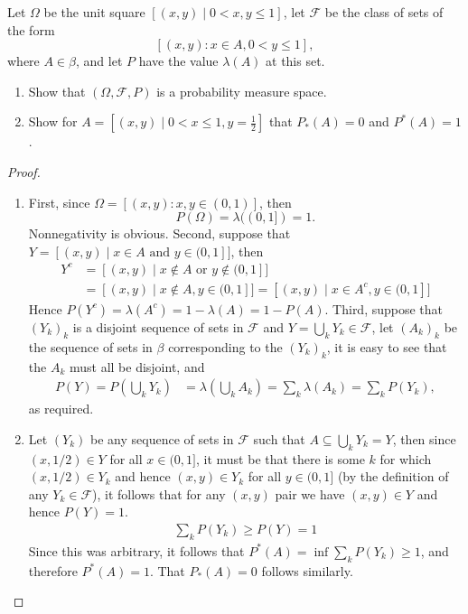 \documentclass[11pt]{article}
\newcommand{\F}{\mathcal{F}}
\newcommand{\B}{\beta}
\newcommand{\seq}{\subseteq}
\newcommand{\Om}{\Omega}
\newenvironment{exercise}[2][Exercise]{\begin{trivlist}
\item[\hskip \labelsep {\bfseries #1}\hskip \labelsep {\bfseries #2.}]}{\end{trivlist}}
\begin{document}
\begin{exercise}{3.5}
    Let $\Om$ be the unit square $\left [ (x, y) \mid 0 < x, y \leq 1 \right]$, let $\F$ be the class of sets of the form 
    \[ [(x, y): x \in A, 0 < y \leq 1] ,\]
     where $A \in \B$, and let $P$ have the value $\lambda(A)$ at this set. 
    \begin{enumerate}
        \item Show that $(\Om, \F, P)$ is a probability measure space.
        \item Show for $A = \left [(x, y) \mid 0 < x \leq 1, y = \frac{1}{2} \right ]$ that $P_{\ast} (A) = 0$ and $P^\ast (A) = 1$.
    \end{enumerate}
\end{exercise}
\begin{proof}
    \begin{enumerate}
        \item First, since $\Om = [(x, y): x, y \in (0, 1)]$, then
        \[ P(\Om) = \lambda( (0, 1] ) = 1. \]
        Nonnegativity is obvious. Second, suppose that $Y = [(x, y) \mid x \in A \text { and } y \in (0, 1]]$, then
        \begin{align*}
            Y^{c} &= [ (x, y) \mid x \notin A \text { or } y \notin (0, 1] ] \\
            &= [ (x, y) \mid x \notin A, y \in (0, 1] ] = [(x, y) \mid x \in A^c, y \in (0, 1]]
        \end{align*}
        Hence $P(Y^c) = \lambda(A^c) = 1 - \lambda(A) = 1 - P(A)$. Third, suppose that $(Y_k)_k$ is a disjoint sequence of sets in $\F$ and $Y = \bigcup_k Y_k \in \F$, let $(A_k)_k$ be the sequence of sets in $\B$ corresponding to the $(Y_k)_k$, it is easy to see that the $A_k$ must all be disjoint, and 
        \begin{align*}
            P(Y) = P \left ( \bigcup_k Y_k \right) &= \lambda \left ( \bigcup_k A_k \right ) = \sum_{k} \lambda(A_k) = \sum_k P(Y_k),
        \end{align*}
        as required.
        \item Let $(Y_k)$ be any sequence of sets in $\F$ such that $A \seq \bigcup_k Y_k = Y$, then since $(x, 1/2) \in Y$ for all $x \in (0, 1]$, it must be that there is some $k$ for which $(x, 1/2) \in Y_k$ and hence $(x, y) \in Y_k$ for all $y \in (0, 1]$ (by the definition of any $Y_k \in \F$), it follows that for any $(x, y)$ pair we have $(x, y) \in Y$ and hence $P(Y) = 1$.
        \begin{align*}
            \sum_k P(Y_k) \geq P \left ( Y \right ) = 1
        \end{align*}
        Since this was arbitrary, it follows that $P^\ast (A) = \inf \sum_k P(Y_k) \geq 1$, and therefore $P^\ast (A) = 1$. That $P_\ast (A) = 0$ follows similarly.
    \end{enumerate}
\end{proof}
\end{document}
